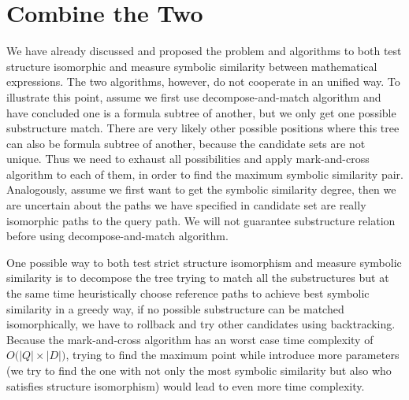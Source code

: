 \section{Combine the Two}
We have already discussed and proposed the problem and algorithms to both test structure isomorphic and measure symbolic similarity between mathematical expressions. The two algorithms, however, do not cooperate in an unified way. 
To illustrate this point, assume we first use decompose-and-match algorithm and have concluded one is a formula subtree of another, but we only get one possible substructure match. 
There are very likely other possible positions where this tree can also be formula subtree of another, because the candidate sets are not unique. 
Thus we need to exhaust all possibilities and apply mark-and-cross algorithm to each of them, in order to find the maximum symbolic similarity pair. 
Analogously, assume we first want to get the symbolic similarity degree, then we are uncertain about the paths we have specified in candidate set are really isomorphic paths to the query path. 
We will not guarantee substructure relation before using decompose-and-match algorithm.

One possible way to both test strict structure isomorphism and measure symbolic similarity is to decompose the tree trying to match all the substructures but at the same time heuristically choose reference paths to achieve best symbolic similarity in a greedy way, if no possible substructure can be matched isomorphically, we have to rollback and try other candidates using backtracking.
Because the mark-and-cross algorithm has an worst case time complexity of $O\big(|Q| \times |D|\big)$,
trying to find the maximum point while introduce more parameters (we try to find the one with not only the most symbolic similarity but also who satisfies structure isomorphism) would lead to even more time complexity. 

